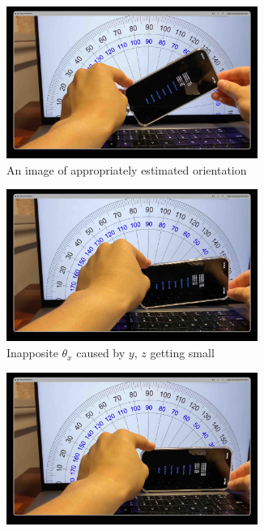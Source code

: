 \documentclass{article}
\begin{document}
    \FloatBarrier
    \begin{figure}[ht]
        \centering
        \begin{subfigure}
            {0.48\textwidth}
            \centering
            \includegraphics[width=0.9\textwidth]{Images/2_1_3_1.jpg}
            \caption{An image of appropriately estimated orientation}
            \label{fig:2_1_3_1}
        \end{subfigure}
        \begin{subfigure}
            {0.48\textwidth}
            \centering
            \includegraphics[width=0.9\textwidth]{Images/2_1_3_2.jpg}
            \caption{Inapposite $\theta_{x}$ caused by $y$, $z$ getting small}
            \label{fig:2_1_3_2}
        \end{subfigure}
        \begin{subfigure}
            {0.48\textwidth}
            \centering
            \includegraphics[width=0.9\textwidth]{Images/2_1_3_3.jpg}

\end{subfigure}
\end{figure}
\end{document}
